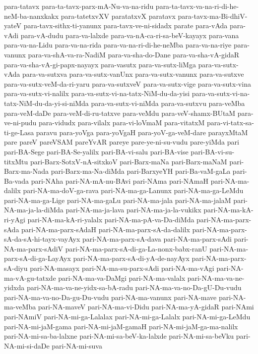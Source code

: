 {para-tatavx
para-ta-tavx-parx-mA-Nu-va-na-ridu
para-ta-tavx-va-na-ri-di-he-neM-ba-nanxkakx
para-tatetxvXV
paratatxvX
paratavx
para-tavx-ma-Bi-dhiV-yateV
para-tavx-sithx-ti-yanunx
para-tavx-ve-ni-sidadx
parate
para-vAda
para-vAdi
para-vA-dudu
para-va-lalxde
para-va-nA-ca-ri-sa-beV-kayayx
para-vana
para-va-na-Lidu
para-va-na-rida
para-va-na-ri-di-he-neMba
para-va-na-riye
para-vanunx
para-va-shA-va-ra-NadiM
para-va-sha-do-Dane
para-va-sha-vA-gidaR
para-va-sha-vA-gi-papx-nayayx
para-vasutx
para-va-sutx-liMga
para-va-sutx-vAda
para-va-sutxva
para-va-sutx-vanUnx
para-va-sutx-vanunx
para-va-sutxve
para-va-sutx-veM-da-ri-yaru
para-va-sutxveV
para-va-sutx-vige
para-va-sutx-vina
para-va-sutx-vi-nalilx
para-va-sutx-vi-na-tatx-NiM-du-da-yisi
para-va-sutx-vi-na-tatx-NiM-du-da-yi-si-niMda
para-va-sutx-vi-niMda
para-va-sutxvu
para-veMba
para-veM-daDe
para-veM-di-ru-tatxve
para-veMdu
para-veV-shamx-BUtaM
para-ve-ni-pudu
para-vidudx
para-vilalx
para-vi-loVmaM
para-vitatxM
para-vi-tatx-sa-ti-ge-Lasa
paravu
para-yoVga
para-yoVgaH
para-yoV-ga-veM-dare
parayxMtaM
pare
pareV
pareVSAM
pareYvAR
pareye
pare-ye-ni-su-vudu
pare-yiMda
pari
pari-BA-Sege
pari-BA-Se-yalilx
pari-BA-vi-salu
pari-BA-vise
pari-BA-vi-su-titxMtu
pari-Barx-SotxV-nA-sitxkoV
pari-Barx-maNa
pari-Barx-maNaM
pari-Barx-ma-Nada
pari-Barx-ma-Na-diMda
pari-BarxyeYH
pari-Ba-vaM-gaLa
pari-Ba-vada
pari-NAha
pari-NA-mA-nu-BAvi
pari-NAma
pari-NAmaH
pari-NA-ma-dalilx
pari-NA-ma-doV-ga-rava
pari-NA-ma-ga-Lanunx
pari-NA-ma-ga-LeMdu
pari-NA-ma-ga-Lige
pari-NA-ma-gaLu
pari-NA-ma-jala
pari-NA-ma-jalaM
pari-NA-ma-ja-la-diMda
pari-NA-ma-ja-lava
pari-NA-ma-ja-la-vukikx
pari-NA-ma-kA-ri-yAgi
pari-NA-ma-kA-ri-yalalx
pari-NA-ma-pA-va-Da-diMda
pari-NA-ma-parx-sAda
pari-NA-ma-parx-sAdaH
pari-NA-ma-parx-sA-da-dalilx
pari-NA-ma-parx-sA-da-sA-hi-tayx-vayAyx
pari-NA-ma-parx-sA-dava
pari-NA-ma-parx-sAdi
pari-NA-ma-parx-sAdiV
pari-NA-ma-parx-sA-di-ga-La-nonx-babx-ranU
pari-NA-ma-parx-sA-di-ga-LayAyx
pari-NA-ma-parx-sA-di-yA-de-nayAyx
pari-NA-ma-parx-sA-diyu
pari-NA-masayx
pari-NA-ma-su-parx-sAdi
pari-NA-ma-vAgi
pari-NA-ma-vA-gu-tatxde
pari-NA-ma-va-DaMgi
pari-NA-ma-valalx
pari-NA-ma-va-ne-yidxda
pari-NA-ma-va-ne-yidx-sa-bA-radu
pari-NA-ma-va-no-Da-gU-Du-vudu
pari-NA-ma-va-no-Da-gu-Du-vudu
pari-NA-ma-vanunx
pari-NA-mave
pari-NA-ma-veMba
pari-NA-maveV
pari-NA-ma-vi-Didu
pari-NA-ma-yA-gidaR
pari-NAmi
pari-NAmiV
pari-NA-mi-ga-Lalalax
pari-NA-mi-ga-Lalalx
pari-NA-mi-ga-LeMdu
pari-NA-mi-jaM-gama
pari-NA-mi-jaM-gamaH
pari-NA-mi-jaM-ga-ma-nalilx
pari-NA-mi-sa-ba-lalxne
pari-NA-mi-sa-beV-ka-lalxde
pari-NA-mi-sa-beVku
pari-NA-mi-si-daDe
pari-NA-mi-suva
}
